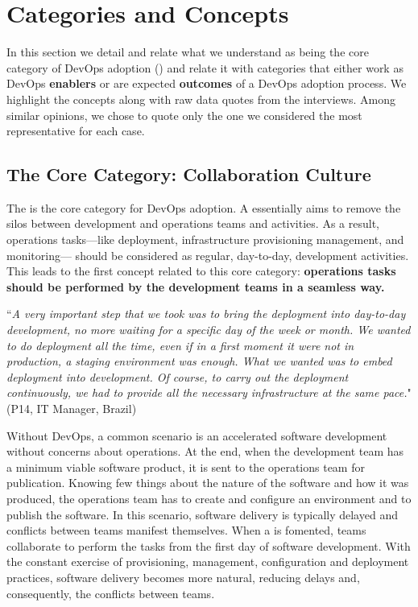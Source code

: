 \section{Categories and Concepts} \label{sec:categories_concepts}

In this section we detail and relate
what we understand as being the core category
of DevOps adoption ()
and relate it with categories that either work as DevOps {\bf enablers} or
are expected {\bf outcomes} of a DevOps adoption process.
We highlight the concepts along with raw data quotes from the interviews.
Among similar opinions, we chose to quote only the one we
considered the most representative for each case.

\subsection{The Core Category: Collaboration Culture}

The  is the core category
for DevOps adoption. A  essentially aims to remove
the silos between development and operations teams and activities.
As a result, operations tasks---like deployment, infrastructure provisioning
management, and monitoring--- should be considered as regular, day-to-day,
development activities. This leads to the first concept related to
this core category: {\bf operations tasks should be performed by
the development teams in a seamless way.}

\begin{mq}
``\emph{A very important step that we took was to bring the deployment into day-to-day
development, no more waiting for a specific day of the week or month. We wanted
to do deployment all the time, even if in a first moment it were not in
production, a staging environment was enough. What we wanted was to embed
deployment into development. Of course, to carry out the deployment
continuously, we had to provide all the necessary infrastructure at the same
pace.}" (P14, IT Manager, Brazil)
\end{mq}

Without DevOps, a common scenario is an accelerated software development
without concerns about operations. At the end, when the development team has a
minimum viable software product, it is sent to the operations team for
publication. Knowing few things about the nature of the software and how it
was produced, the operations team has to create and configure an environment
and to publish the software. In this scenario, software delivery is typically
delayed and conflicts between teams manifest themselves. When a  is fomented, teams collaborate to perform the tasks from the first day
of software development. With the constant exercise of provisioning, management,
configuration and deployment practices, software delivery becomes more natural,
reducing delays and, consequently, the conflicts between teams.

